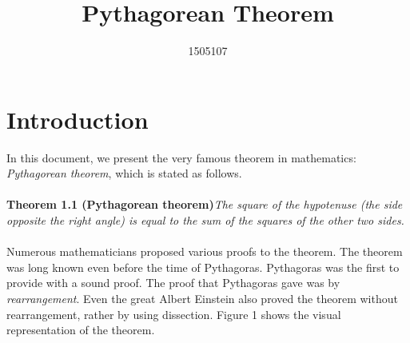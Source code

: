 \documentclass[14pt]{article}
\title{Pythagorean Theorem}
\author{1505107}
\begin{document}
\maketitle


\section{Introduction}
In this document, we present the very famous theorem in mathematics: \textit{ Pythagorean
theorem}, which is stated as follows.\\
\\
\textbf{Theorem 1.1 (Pythagorean theorem)}\textit{The square of the hypotenuse (the
	side opposite the right angle) is equal to the sum of the squares of the other two
	sides.}\\
\\
Numerous mathematicians proposed various proofs to the theorem. The
theorem was long known even before the time of Pythagoras. Pythagoras was
the first to provide with a sound proof. The proof that Pythagoras gave was
by \textit{rearrangement}. Even the great Albert Einstein also proved the theorem
without rearrangement, rather by using dissection. Figure 1 shows the visual
representation of the theorem.\\\\
\end{document}
